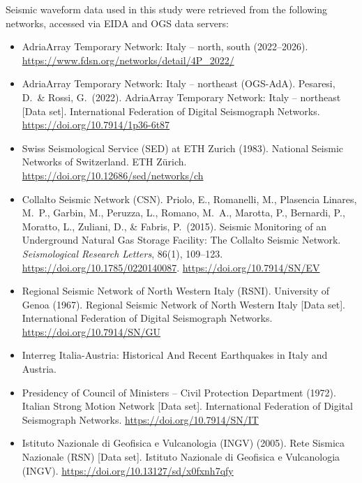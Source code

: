 Seismic waveform data used in this study were retrieved from the following
networks, accessed via EIDA and OGS data servers:

\begin{itemize}[leftmargin=*]
  \item[\textbf{[4P]}] AdriaArray Temporary Network: Italy -- north, south
    (2022--2026).
    \url{https://www.fdsn.org/networks/detail/4P_2022/}

  \item[\textbf{[2Y]}] AdriaArray Temporary Network: Italy -- northeast
    (OGS-AdA). Pesaresi, D.\ \& Rossi, G.\ (2022). AdriaArray Temporary
    Network: Italy -- northeast [Data set]. International Federation of
    Digital Seismograph Networks.
    \url{https://doi.org/10.7914/1p36-6t87}

  \item[\textbf{[CH]}] Swiss Seismological Service (SED) at ETH Zurich
    (1983). National Seismic Networks of Switzerland. ETH Z\"urich.
    \url{https://doi.org/10.12686/sed/networks/ch}

  \item[\textbf{[EV]}] Collalto Seismic Network (CSN). Priolo, E.,
    Romanelli, M., Plasencia Linares, M.\ P., Garbin, M., Peruzza, L.,
    Romano, M.\ A., Marotta, P., Bernardi, P., Moratto, L., Zuliani, D.,
    \& Fabris, P.\ (2015). Seismic Monitoring of an Underground Natural
    Gas Storage Facility: The Collalto Seismic Network.
    \textit{Seismological Research Letters}, 86(1), 109--123.
    \url{https://doi.org/10.1785/0220140087}.
    \url{https://doi.org/10.7914/SN/EV}

  \item[\textbf{[GU]}] Regional Seismic Network of North Western Italy
    (RSNI). University of Genoa (1967). Regional Seismic Network of North
    Western Italy [Data set]. International Federation of Digital
    Seismograph Networks.
    \url{https://doi.org/10.7914/SN/GU}

  \item[\textbf{[HA]}] Interreg Italia-Austria: Historical And Recent
    Earthquakes in Italy and Austria.

  \item[\textbf{[IT]}] Presidency of Council of Ministers -- Civil
    Protection Department (1972). Italian Strong Motion Network [Data set].
    International Federation of Digital Seismograph Networks.
    \url{https://doi.org/10.7914/SN/IT}

  \item[\textbf{[IV]}] Istituto Nazionale di Geofisica e Vulcanologia
    (INGV) (2005). Rete Sismica Nazionale (RSN) [Data set]. Istituto
    Nazionale di Geofisica e Vulcanologia (INGV).
    \url{https://doi.org/10.13127/sd/x0fxnh7qfy}


\end{itemize}
